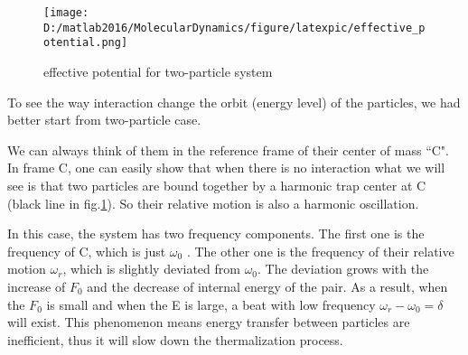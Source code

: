 \documentclass[aps,pre,twocolumn,groupedaddress]{revtex4-1}
\begin{document}
\begin{figure}[hbtp]
\centering
\texttt{[image: D:/matlab2016/MolecularDynamics/figure/latexpic/effective\_potential.png]}
\caption{effective potential for two-particle system}
\label{fig:thermalization2}
\end{figure}

To see the way interaction change the orbit (energy level) of the particles, we had better start from two-particle case.

We can always think of them in the reference frame of their center of mass ``C". In frame C, one can easily show that when there is no interaction what we will see is that two particles are bound together by a harmonic trap center at C (black line in fig.\ref{fig:thermalization2}). So their relative motion is also a harmonic oscillation. 

In this case, the system has two frequency components. The first one is the frequency of C, which is just $\omega_0$ . The other one is the frequency of their relative motion $\omega_r$, which is slightly deviated from $\omega_0$. The deviation grows with the increase of $F_0$ and the decrease of internal energy of the pair. As a result, when the $F_0$ is small and when the E is large, a beat with low frequency $\omega_r-\omega_0=\delta$ will exist. This phenomenon means energy transfer between particles are inefficient, thus it will slow down the thermalization process. 
\end{document}
